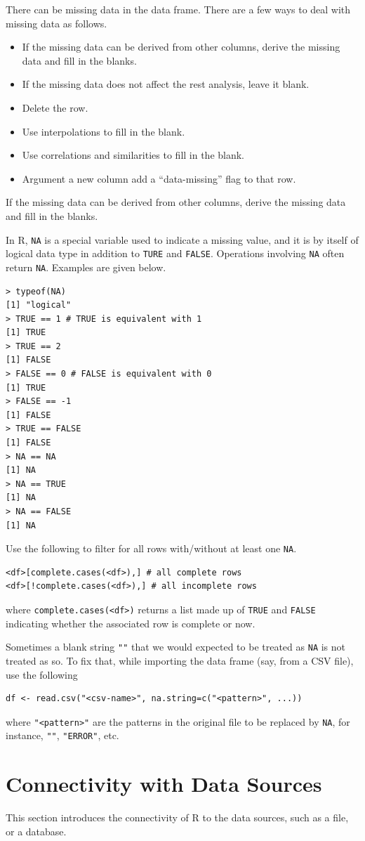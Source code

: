 There can be missing data in the data frame. There are a few ways to deal with missing data as follows.
\begin{itemize}
	\item If the missing data can be derived from other columns, derive the missing data and fill in the blanks.
	\item If the missing data does not affect the rest analysis, leave it blank.
	\item Delete the row.
	\item Use interpolations to fill in the blank.
	\item Use correlations and similarities to fill in the blank.
	\item Argument a new column add a ``data-missing'' flag to that row.
\end{itemize}

If the missing data can be derived from other columns, derive the missing data and fill in the blanks.

In R, \verb|NA| is a special variable used to indicate a missing value, and it is by itself of logical data type in addition to \verb|TURE| and \verb|FALSE|. Operations involving \verb|NA| often return \verb|NA|. Examples are given below.
\begin{lstlisting}
> typeof(NA)
[1] "logical"
> TRUE == 1 # TRUE is equivalent with 1
[1] TRUE
> TRUE == 2
[1] FALSE
> FALSE == 0 # FALSE is equivalent with 0
[1] TRUE
> FALSE == -1
[1] FALSE
> TRUE == FALSE
[1] FALSE
> NA == NA
[1] NA
> NA == TRUE
[1] NA
> NA == FALSE
[1] NA
\end{lstlisting}

Use the following to filter for all rows with/without at least one \verb|NA|.
\begin{lstlisting}
<df>[complete.cases(<df>),] # all complete rows
<df>[!complete.cases(<df>),] # all incomplete rows
\end{lstlisting}
where \verb|complete.cases(<df>)| returns a list made up of \verb|TRUE| and \verb|FALSE| indicating whether the associated row is complete or now.

Sometimes a blank string \verb|""| that we would expected to be treated as \verb|NA| is not treated as so. To fix that, while importing the data frame (say, from a CSV file), use the following
\begin{lstlisting}
df <- read.csv("<csv-name>", na.string=c("<pattern>", ...))
\end{lstlisting}
where \verb|"<pattern>"| are the patterns in the original file to be replaced by \verb|NA|, for instance, \verb|""|, \verb|"ERROR"|, etc.














\section{Connectivity with Data Sources} \label{ch:r1:sec:datasource}

This section introduces the connectivity of R to the data sources, such as a file, or a database.







